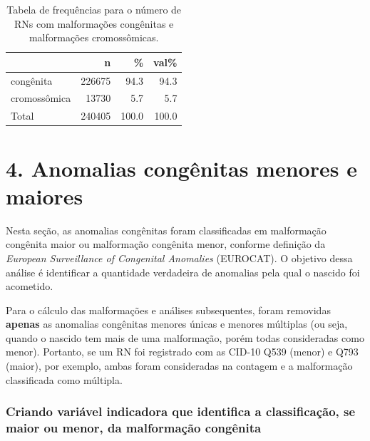\documentclass[
]{article}
\begin{document}
\begin{table}[H]

\caption{\label{tab:unnamed-chunk-7}Tabela de frequências para o número de RNs com malformações congênitas e malformações cromossômicas.}
\centering
\begin{tabular}[t]{l|r|r|r}
\hline
  & n & \% & val\%\\
\hline
congênita & 226675 & 94.3 & 94.3\\
\hline
cromossômica & 13730 & 5.7 & 5.7\\
\hline
Total & 240405 & 100.0 & 100.0\\
\hline
\end{tabular}
\end{table}

\newpage

\hypertarget{anomalias-conguxeanitas-menores-e-maiores}{%
\section{4. Anomalias congênitas menores e
maiores}\label{anomalias-conguxeanitas-menores-e-maiores}}

Nesta seção, as anomalias congênitas foram classificadas em malformação
congênita maior ou malformação congênita menor, conforme definição da
\emph{European Surveillance of Congenital Anomalies} (EUROCAT). O
objetivo dessa análise é identificar a quantidade verdadeira de
anomalias pela qual o nascido foi acometido.

Para o cálculo das malformações e análises subsequentes, foram removidas
\textbf{apenas} as anomalias congênitas menores únicas e menores
múltiplas (ou seja, quando o nascido tem mais de uma malformação, porém
todas consideradas como menor). Portanto, se um RN foi registrado com as
CID-10 Q539 (menor) e Q793 (maior), por exemplo, ambas foram
consideradas na contagem e a malformação classificada como múltipla.

\hypertarget{criando-variuxe1vel-indicadora-que-identifica-a-classificauxe7uxe3o-se-maior-ou-menor-da-malformauxe7uxe3o-conguxeanita}{%
\subsubsection{Criando variável indicadora que identifica a
classificação, se maior ou menor, da malformação
congênita}\label{criando-variuxe1vel-indicadora-que-identifica-a-classificauxe7uxe3o-se-maior-ou-menor-da-malformauxe7uxe3o-conguxeanita}}
\end{document}
